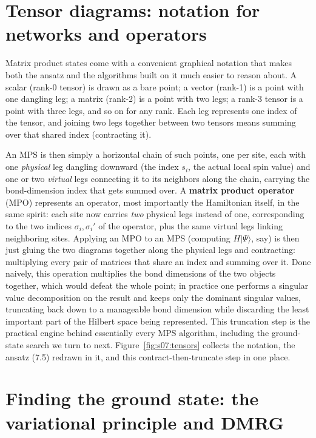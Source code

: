 \section{Tensor diagrams: notation for networks and operators}

Matrix product states come with a convenient graphical notation that makes both the ansatz and the
algorithms built on it much easier to reason about. A scalar (rank-0 tensor) is drawn as a bare point;
a vector (rank-1) is a point with one dangling leg; a matrix (rank-2) is a point with two legs; a
rank-3 tensor is a point with three legs, and so on for any rank. Each leg represents one index of the
tensor, and joining two legs together between two tensors means summing over that shared index
(contracting it).

An MPS is then simply a horizontal chain of such points, one per site, each with one \emph{physical} leg
dangling downward (the index $s_i$, the actual local spin value) and one or two \emph{virtual} legs
connecting it to its neighbors along the chain, carrying the bond-dimension index that gets summed
over. A \textbf{matrix product operator} (MPO) represents an operator, most importantly the Hamiltonian
itself, in the same spirit: each site now carries \emph{two} physical legs instead of one, corresponding to
the two indices $\sigma_i,\sigma_i'$ of the operator, plus the same virtual legs linking neighboring
sites. Applying an MPO to an MPS (computing $H|\Psi\rangle$, say) is then just gluing the two diagrams
together along the physical legs and contracting: multiplying every pair of matrices that share an
index and summing over it. Done naively, this operation multiplies the bond dimensions of the two
objects together, which would defeat the whole point; in practice one performs a singular value
decomposition on the result and keeps only the dominant singular values, truncating back down to a
manageable bond dimension while discarding the least important part of the Hilbert space being
represented. This truncation step is the practical engine behind essentially every MPS algorithm,
including the ground-state search we turn to next. Figure~\ref{fig:s07:tensors} collects the
notation, the ansatz (7.5) redrawn in it, and this contract-then-truncate step in one place.



\section{Finding the ground state: the variational principle and DMRG}

